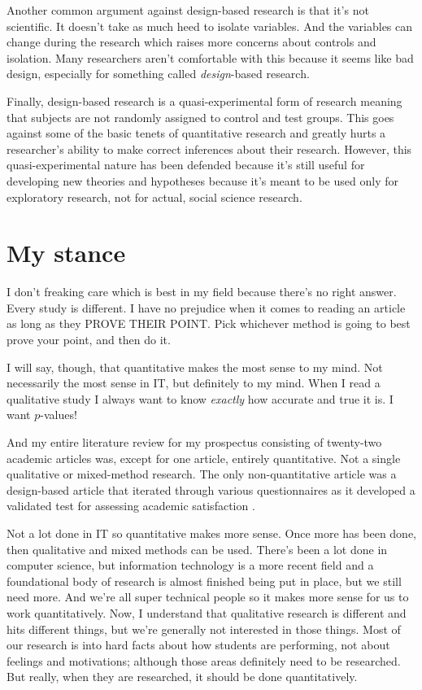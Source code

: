 \documentclass[man,natbib]{apa6}
\begin{document}
Another common argument against design-based research \citep{shavelson2003science} is that it's not scientific. It doesn't take as much heed to isolate variables. And the variables can change during the research which raises more concerns about controls and isolation. Many researchers aren't comfortable with this because it seems like bad design, especially for something called \emph{design}-based research.

Finally, design-based research is a quasi-experimental form of research meaning that subjects are not randomly assigned to control and test groups. This goes against some of the basic tenets of quantitative research and greatly hurts a researcher's ability to make correct inferences about their research. However, this quasi-experimental nature has been defended \citep{brown1992design} because it's still useful for developing new theories and hypotheses because it's meant to be used only for exploratory research, not for actual, social science research.

\section{My stance}
I don't freaking care which is best in my field because there's no right answer. Every study is different. I have no prejudice when it comes to reading an article as long as they PROVE THEIR POINT. Pick whichever method is going to best prove your point, and then do it.

I will say, though, that quantitative makes the most sense to my mind. Not necessarily the most sense in IT, but definitely to my mind. When I read a qualitative study I always want to know \emph{exactly} how accurate and true it is. I want $p$-values!

And my entire literature review for my prospectus consisting of twenty-two academic articles was, except for one article, entirely quantitative. Not a single qualitative or mixed-method research. The only non-quantitative article was a design-based article that iterated through various questionnaires as it developed a validated test for assessing academic satisfaction \citep{nauta2007assessing}.

Not a lot done in IT so quantitative makes more sense. Once more has been done, then qualitative and mixed methods can be used. There's been a lot done in computer science, but information technology is a more recent field and a foundational body of research is almost finished being put in place, but we still need more. And we're all super technical people so it makes more sense for us to work quantitatively. Now, I understand that qualitative research is different and hits different things, but we're generally not interested in those things. Most of our research is into hard facts about how students are performing, not about feelings and motivations; although those areas definitely need to be researched. But really, when they are researched, it should be done quantitatively.


\end{document}
